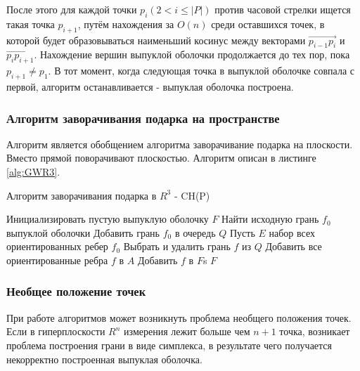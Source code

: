 \documentclass[a4paper,14pt]{extarticle}  %
\begin{document}
После этого для каждой точки $p_i \left(2 < i\leq|P|\right)$ против часовой стрелки ищется такая точка $p_{i+1}$, путём нахождения за $O(n)$ среди оставшихся точек, в которой будет образовываться наименьший косинус между векторами $\overrightarrow{p_{i-1}p_i}$ и $\overrightarrow{p_ip_{i+1}}$.
Нахождение вершин выпуклой оболочки продолжается до тех пор, пока $p_{i+1}\neq p_1$. В тот момент, когда следующая точка в выпуклой оболочке совпала с первой, алгоритм останавливается - выпуклая оболочка построена.

\subsubsection{Алгоритм заворачивания подарка на пространстве}\label{sec:gw3d}
Алгоритм является обобщением алгоритма заворачивание подарка на плоскости. Вместо прямой поворачивают плоскостью. Алгоритм описан в листинге \ref{alg:GWR3}.


\begin{algorithm*}[H]
    \caption{Алгоритм заворачивания подарка в $R^3$ - CH(P)}
    \label{alg:GWR3}
    \DontPrintSemicolon
    Инициализировать пустую выпуклую оболочку $F$\;
    Найти исходную грань $f_0$ выпуклой оболочки\;
    Добавить грань $f_0$ в очередь $Q$\;
    Пусть $E$ набор всех ориентированных ребер $f_0$\;
    {
        Выбрать и удалить грань $f$ из $Q$\;
        Добавить все ориентированные ребра $f$ в $A$\;
        Добавить $f$ в $F$s
    }
    \Return $F$
\end{algorithm*}

\subsubsection{Необщее положение точек}
При работе алгоритмов может возникнуть проблема необщего положения точек.
Если в гиперплоскости $R^n$ измерения лежит больше чем $n+1$ точка, возникает проблема построения грани в виде симплекса, в результате чего получается некорректно построенная выпуклая оболочка.
\end{document}
